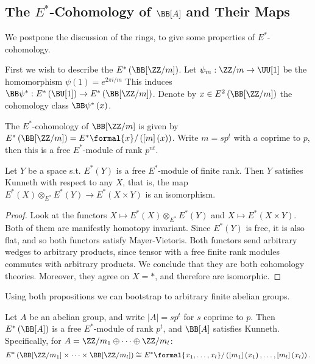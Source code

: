 \subsection{The \texorpdfstring{$E^*$}{E*}-Cohomology of \texorpdfstring{$\BB[A]$}{BA} and Their Maps}

We postpone the discussion of the rings, to give some properties of $E^*$-cohomology.

First we wish to describe the $E^*\left(\BB[\ZZ/m]\right)$.
Let $\psi_m: \ZZ/m \to \UU[1]$ be the homomorphism $\psi\left(1\right) = e^{2\pi i/m}$
This induces $\BB\psi^*: E^*\left(\BU[1]\right) \to E^*\left(\BB[\ZZ/m]\right)$.
Denote by $x \in E^2\left(\BB[\ZZ/m]\right)$ the cohomology class $\BB\psi^*\left(x\right)$.

\begin{proposition}
	The $E^*$-cohomology of $\BB[\ZZ/m]$ is given by $E^*\left(\BB[\ZZ/m]\right) = E^*\formal{x} / \left(\left[m\right]\left(x\right)\right)$.
	Write $m = sp^t$ with $a$ coprime to $p$, then this is a free $E^*$-module of rank $p^{nt}$.
\end{proposition}

\begin{proposition}
	Let $Y$ be a space s.t. $E^*\left(Y\right)$ is a free $E^*$-module of finite rank.
	Then $Y$ satisfies Kunneth with respect to any $X$, that is, the map $E^*\left(X\right) \otimes_{E^*} E^*\left(Y\right) \to E^*\left(X \times Y\right)$ is an isomorphism.
\end{proposition}

\begin{proof}
	Look at the functors $X \mapsto E^*\left(X\right) \otimes_{E^*} E^*\left(Y\right)$ and $X \mapsto E^*\left(X \times Y\right)$.
	Both of them are manifestly homotopy invariant.
	Since $E^*\left(Y\right)$ is free, it is also flat, and so both functors satisfy Mayer-Vietoris.
	Both functors send arbitrary wedges to arbitrary products, since tensor with a free finite rank modules commutes with arbitrary products.
	We conclude that they are both cohomology theories.
	Moreover, they agree on $X = *$, and therefore are isomorphic.
\end{proof}

Using both propositions we can bootstrap to arbitrary finite abelian groups.

\begin{proposition}\label{E-B-abelian}
	Let $A$ be an abelian group, and write $\left|A\right| = sp^t$ for $s$ coprime to $p$.
	Then $E^*\left(\BB[A]\right)$ is a free $E^*$-module of rank $p^t$, and $\BB[A]$ satisfies Kunneth.
	Specifically, for $A = \ZZ/m_1 \oplus \cdots \oplus \ZZ/m_l$:
	$$
	E^*\left(\BB[\ZZ/m_1] \times \cdots \times \BB[\ZZ/m_l]\right)
	\cong E^*\formal{x_1, \dotsc, x_l}/\left(\left[m_1\right]\left(x_1\right), \dotsc, \left[m_l\right]\left(x_l\right)\right).
	$$
\end{proposition}

